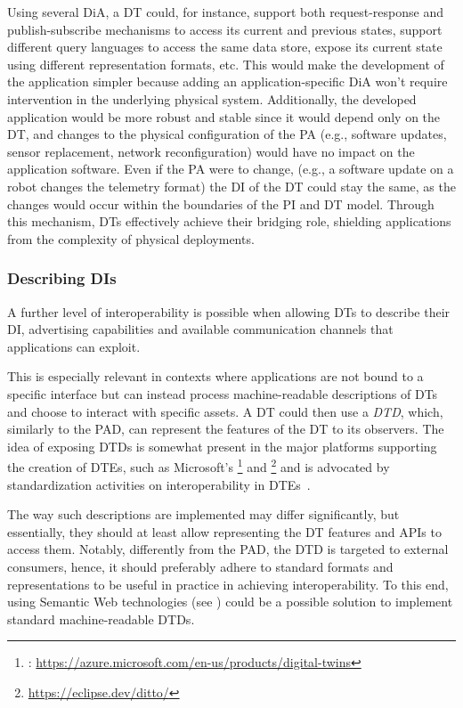 Using several \ac{DiA}, a \ac{DT} could, for instance, support both request-response and publish-subscribe mechanisms to access its current and previous states, support different query languages to access the same data store, expose its current state using different representation formats, etc.
%
This would make the development of the application simpler because adding an application-specific \ac{DiA} won't require intervention in the underlying physical system. 
%
Additionally, the developed application would be more robust and stable since it would depend only on the \ac{DT}, and changes to the physical configuration of the \ac{PA} (e.g., software updates, sensor replacement, network reconfiguration) would have no impact on the application software.
%
Even if the \ac{PA} were to change, (e.g., a software update on a robot changes the telemetry format) the \ac{DI} of the \ac{DT} could stay the same, as the changes would occur within the boundaries of the \ac{PI} and \ac{DT} model.
%
Through this mechanism, \acp{DT} effectively achieve their bridging role, shielding applications from the complexity of physical deployments.

\subsubsection{Describing \aclp{DI}}

A further level of interoperability is possible when allowing \acp{DT} to describe their \ac{DI}, advertising capabilities and available communication channels that applications can exploit.

This is especially relevant in contexts where applications are not bound to a specific interface but can instead process machine-readable descriptions of \acp{DT} and choose to interact with specific assets.
%
A \ac{DT} could then use a \emph{\ac{DTD}}, which, similarly to the \ac{PAD}, can represent the features of the \ac{DT} to its observers.
%
The idea of exposing \acp{DTD} is somewhat present in the major platforms supporting the creation of \acp{DTE}, such as 
Microsoft's \azureTwin{}\footnote{\azureTwin{}: \url{https://azure.microsoft.com/en-us/products/digital-twins}} and \ditto{}\footnote{\ditto{} \url{https://eclipse.dev/ditto/}} and is advocated by standardization activities on interoperability in \acp{DTE}~\cite{etsi-dt-comm-requirements-2024}.

The way such descriptions are implemented may differ significantly, but essentially, they should at least allow representing the \ac{DT}  features and APIs to access them.
%
Notably, differently from the \ac{PAD}, the \ac{DTD} is targeted to external consumers, hence, it should preferably adhere to standard formats and representations to be useful in practice in achieving interoperability.
%
To this end, using Semantic Web technologies (see ) could be a possible solution to implement standard machine-readable \acp{DTD}.

